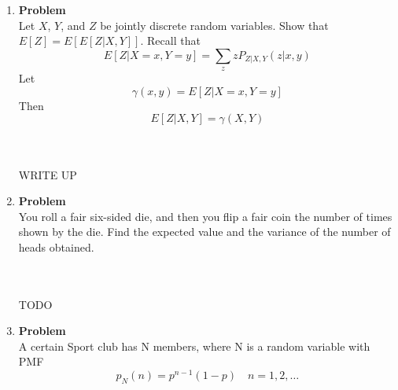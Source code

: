 \documentclass[12pt]{article}
\newenvironment{Ex}{\textbf{Problem}\vspace{.75em}\\}{}
\newcommand{\dd}[1]{\:\mathrm{d}{#1}}
\begin{document}
\begin{enumerate}
\begin{Ex}
\begin{solution}
      \begin{equation}
        \label{eq:1-conditional-expectation}
        \begin{aligned}
          E[X|Y] &= \int_y^1 x f_{X|Y}(x|y) \dd{x} \\
          &= \frac{1}{1-y} \int_y^1 x \dd{x} \\
          &= \frac{1}{1-y} \left[\frac{x^2}{2}\right]_y^1 \\
          &= \frac{1}{2(1-y)} (1-y^2) \\
          &= \frac{1}{2(1-y)} (1-y)(1+y) \\
          &= \frac{1+y}{2} \\
          \implies E[X|Y] &= \frac{1+Y}{2} \\
        \end{aligned}
      \end{equation}
      {\color{red} \huge FIND CONDITIONAL VARIANCE}
    \end{solution}
  \end{Ex}
\item
  \begin{Ex}
    Let $X$, $Y$, and $Z$ be jointly discrete random variables. Show
    that $E[Z] = E[E[Z|X,Y]]$.
    Recall that $$E[Z|X=x,Y=y] = \sum_z zP_{Z|X,Y}(z|x,y)$$
    Let $$\gamma(x,y)=E[Z|X=x,Y=y]$$
    Then $$E[Z|X,Y] = \gamma(X,Y)$$
    \begin{solution} \hfill
      \\\\ {\color{red} \huge WRITE UP}
    \end{solution}
  \end{Ex}
\item
  \begin{Ex}
    You roll a fair six-sided die, and then you flip a fair coin the
    number of times shown by the die. Find the expected value and the
    variance of the number of heads obtained.
    \begin{solution} \hfill
      \\\\ {\color{red} \huge TODO}
    \end{solution}
  \end{Ex}
\item
  \begin{Ex}
    A certain Sport club has N members, where N is a random variable
    with PMF
    \begin{equation}
      \label{eq:4-question-0}
      p_N(n) = p^{n-1}(1-p) \quad n=1,2,\ldots
    \end{equation}

\end{Ex}
\end{enumerate}
\end{document}
